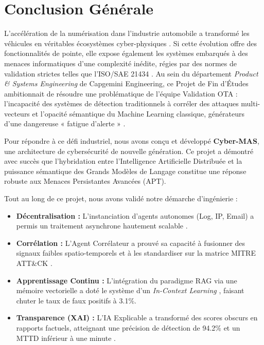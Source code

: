 \documentclass[a4paper, 12pt]{report}
\begin{document}
\chapter*{Conclusion Générale}

L'accélération de la numérisation dans l'industrie automobile a transformé les véhicules en véritables écosystèmes cyber-physiques \cite{ibm_report}. Si cette évolution offre des fonctionnalités de pointe, elle expose également les systèmes embarqués à des menaces informatiques d'une complexité inédite, régies par des normes de validation strictes telles que l'ISO/SAE 21434 \cite{iso_21434}. Au sein du département \textit{Product \& Systems Engineering} de Capgemini Engineering, ce Projet de Fin d'Études ambitionnait de résoudre une problématique de l'équipe Validation OTA : l'incapacité des systèmes de détection traditionnels à corréler des attaques multi-vecteurs \cite{cisco_trends} et l'opacité sémantique du Machine Learning classique, générateurs d'une dangereuse « fatigue d'alerte » \cite{hassan_alert_fatigue}.

Pour répondre à ce défi industriel, nous avons conçu et développé \textbf{Cyber-MAS}, une architecture de cybersécurité de nouvelle génération. Ce projet a démontré avec succès que l'hybridation entre l'Intelligence Artificielle Distribuée \cite{wooldridge_mas} et la puissance sémantique des Grands Modèles de Langage \cite{openai_gpt4} constitue une réponse robuste aux Menaces Persistantes Avancées (APT). 

Tout au long de ce projet, nous avons validé notre démarche d'ingénierie :
\begin{itemize}
    \item \textbf{Décentralisation :} L'instanciation d'agents autonomes (Log, IP, Email) a permis un traitement asynchrone hautement scalable \cite{kotkar_mas}.
    \item \textbf{Corrélation :} L'Agent Corrélateur a prouvé sa capacité à fusionner des signaux faibles spatio-temporels et à les standardiser sur la matrice MITRE ATT\&CK \cite{mitre_attack}.
    \item \textbf{Apprentissage Continu :} L'intégration du paradigme RAG \cite{lewis_rag} via une mémoire vectorielle a doté le système d'un \textit{In-Context Learning} \cite{dong_icl}, faisant chuter le taux de faux positifs à 3.1\%.
    \item \textbf{Transparence (XAI) :} L'IA Explicable \cite{darpa_xai} a transformé des scores obscurs en rapports factuels, atteignant une précision de détection de 94.2\% et un MTTD inférieur à une minute \cite{sans_soc_kpi}.
\end{itemize}
\end{document}
